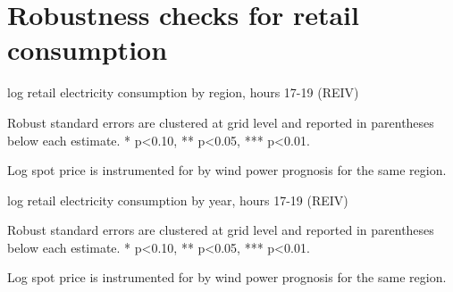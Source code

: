 \section{Robustness checks for retail consumption}
\label{app:robustness_retail}
\begin{table}[H]
\begin{threeparttable}
  \centering
  \caption{log retail electricity consumption by region, hours 17-19 (REIV)}
  \label{tab:r_region}
  \footnotesize
    
    \begin{tablenotes}
    \item Robust standard errors are clustered at grid level and reported in parentheses below each estimate. * p<0.10, ** p<0.05, *** p<0.01.
    \item Log spot price is instrumented for by wind power prognosis for the same region.
  \end{tablenotes}
\end{threeparttable}
\end{table}
\begin{table}[H]
\begin{threeparttable}
  \centering
  \caption{log retail electricity consumption by year, hours 17-19 (REIV)}
  \label{tab:r_year}
  \footnotesize
    
    \begin{tablenotes}
    \item Robust standard errors are clustered at grid level and reported in parentheses below each estimate. * p<0.10, ** p<0.05, *** p<0.01.
    \item Log spot price is instrumented for by wind power prognosis for the same region.
  \end{tablenotes}
\end{threeparttable}
\end{table}
